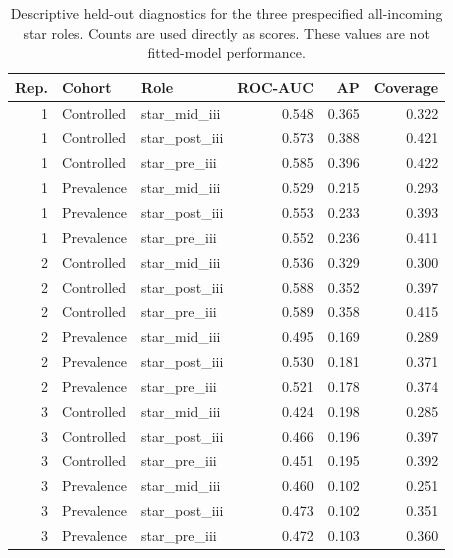 \begin{table}[ht]
\centering
\caption{Descriptive held-out diagnostics for the three prespecified all-incoming star roles. Counts are used directly as scores. These values are not fitted-model performance.}
\label{tab:res_rq1_incoming}
\footnotesize
\begin{tabular}{@{}r l l r r r@{}}
\toprule
\textbf{Rep.} & \textbf{Cohort} & \textbf{Role} & \textbf{ROC-AUC} & \textbf{AP} & \textbf{Coverage} \\
\midrule
1 & Controlled & star\_mid\_iii & 0.548 & 0.365 & 0.322 \\
1 & Controlled & star\_post\_iii & 0.573 & 0.388 & 0.421 \\
1 & Controlled & star\_pre\_iii & 0.585 & 0.396 & 0.422 \\
1 & Prevalence & star\_mid\_iii & 0.529 & 0.215 & 0.293 \\
1 & Prevalence & star\_post\_iii & 0.553 & 0.233 & 0.393 \\
1 & Prevalence & star\_pre\_iii & 0.552 & 0.236 & 0.411 \\
2 & Controlled & star\_mid\_iii & 0.536 & 0.329 & 0.300 \\
2 & Controlled & star\_post\_iii & 0.588 & 0.352 & 0.397 \\
2 & Controlled & star\_pre\_iii & 0.589 & 0.358 & 0.415 \\
2 & Prevalence & star\_mid\_iii & 0.495 & 0.169 & 0.289 \\
2 & Prevalence & star\_post\_iii & 0.530 & 0.181 & 0.371 \\
2 & Prevalence & star\_pre\_iii & 0.521 & 0.178 & 0.374 \\
3 & Controlled & star\_mid\_iii & 0.424 & 0.198 & 0.285 \\
3 & Controlled & star\_post\_iii & 0.466 & 0.196 & 0.397 \\
3 & Controlled & star\_pre\_iii & 0.451 & 0.195 & 0.392 \\
3 & Prevalence & star\_mid\_iii & 0.460 & 0.102 & 0.251 \\
3 & Prevalence & star\_post\_iii & 0.473 & 0.102 & 0.351 \\
3 & Prevalence & star\_pre\_iii & 0.472 & 0.103 & 0.360 \\
\bottomrule
\end{tabular}
\end{table}
